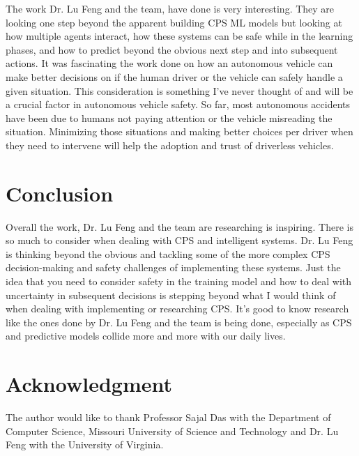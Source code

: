 \documentclass[journal,onecolumn]{IEEEtran}
\begin{document}
The work Dr. Lu Feng and the team, have done is very interesting. They are looking one step beyond the apparent building CPS ML models but looking at how multiple agents interact, how these systems can be safe while in the learning phases, and how to predict beyond the obvious next step and into subsequent actions. It was fascinating the work done on how an autonomous vehicle can make better decisions on if the human driver or the vehicle can safely handle a given situation. This consideration is something I've never thought of and will be a crucial factor in autonomous vehicle safety. So far, most autonomous accidents have been due to humans not paying attention or the vehicle misreading the situation. Minimizing those situations and making better choices per driver when they need to intervene will help the adoption and trust of driverless vehicles.

\section{Conclusion}

Overall the work, Dr. Lu Feng and the team are researching is inspiring. There is so much to consider when dealing with CPS and intelligent systems. Dr. Lu Feng is thinking beyond the obvious and tackling some of the more complex CPS decision-making and safety challenges of implementing these systems. Just the idea that you need to consider safety in the training model and how to deal with uncertainty in subsequent decisions is stepping beyond what I would think of when dealing with implementing or researching CPS. It's good to know research like the ones done by Dr. Lu Feng and the team is being done, especially as CPS and predictive models collide more and more with our daily lives. 




\section*{Acknowledgment}
The author would like to thank Professor Sajal Das with the Department of Computer Science, Missouri University of Science and Technology and Dr. Lu Feng with the University of Virginia.
\end{document}
